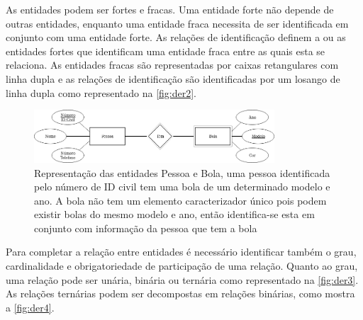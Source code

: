 \documentclass[11pt,twoside,a4paper]{report}
\begin{document}
As entidades podem ser fortes e fracas. Uma entidade forte não depende de outras entidades, enquanto uma entidade fraca necessita de ser identificada em conjunto com uma entidade forte. As relações de identificação definem a ou as entidades fortes que identificam uma entidade fraca entre as quais esta se relaciona. As entidades fracas são representadas por caixas retangulares com linha dupla e as relações de identificação são identificadas por um losango de linha dupla como representado na \autoref{fig:der2}.
\begin{figure}[H]
	\begin{center}
		\includegraphics[width=0.8\textwidth]{notacao2} %
		\caption[Representação de entidades fortes e fracas e relação de identificação]{Representação das entidades Pessoa e Bola, uma pessoa identificada pelo número de ID civil tem uma bola de um determinado modelo e ano. A bola não tem um elemento caracterizador único pois podem existir bolas do mesmo modelo e ano, então identifica-se esta em conjunto com informação da pessoa que tem a bola}
		\label{fig:der2}
	\end{center}
\end{figure}
\newpage
Para completar a relação entre entidades é necessário identificar também o grau, cardinalidade e obrigatoriedade de participação de uma relação. Quanto ao grau, uma relação pode ser unária, binária ou ternária como representado na \autoref{fig:der3}. As relações ternárias podem ser decompostas em relações binárias, como mostra a \autoref{fig:der4}.
\vspace{2cm}
\end{document}
